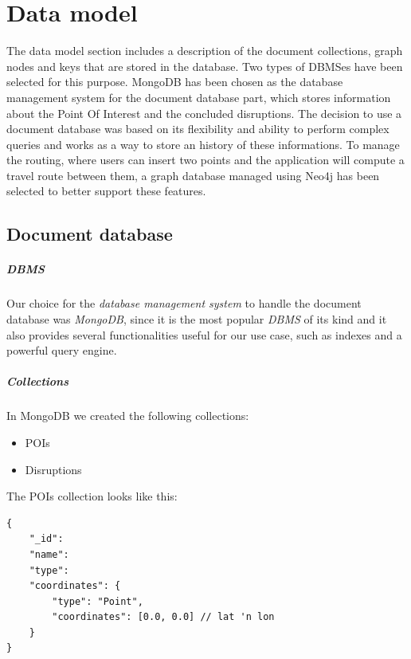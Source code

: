 \chapter{Data model}

The data model section includes a description of the document collections, graph nodes and keys that are stored in the database. Two types of DBMSes have been selected for this purpose. 
MongoDB has been chosen as the database management system for the document database part, which stores information about the Point Of Interest and the concluded disruptions.
The decision to use a document database was based on its flexibility and ability to perform complex queries and works as a way to store an history of these informations.
To manage the routing, where users can insert two points and the application will compute a travel route between them, a graph database managed using Neo4j has been selected to better support these features.

\section{Document database}

\paragraph{DBMS} Our choice for the \textit{database management system} to 
handle the document database was \textit{MongoDB}, since it is the most popular 
\textit{DBMS} of its kind and it also provides several functionalities useful 
for our use case, such as indexes and a powerful query engine.

\paragraph{Collections} In MongoDB we created the following collections:

\begin{itemize}
	\item POIs
	\item Disruptions
\end{itemize}

The POIs collection looks like this:
\begin{lstlisting}
{
	"_id":
	"name":
	"type":
	"coordinates": {
		"type": "Point",
		"coordinates": [0.0, 0.0] // lat 'n lon
	}
}
\end{lstlisting}

